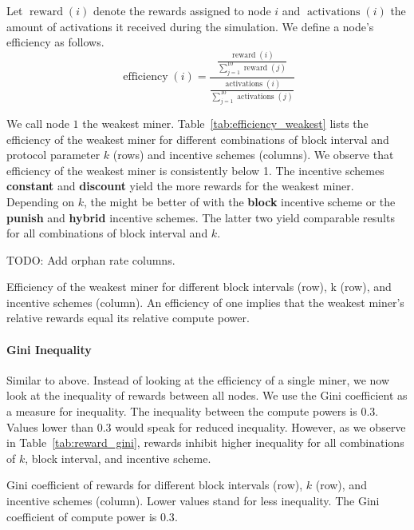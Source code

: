 \documentclass{article}
\begin{document}
Let $\operatorname{reward}(i)$ denote the rewards assigned to node $i$ and $\operatorname{activations}(i)$ the amount of activations it received during the simulation.
We define a node's efficiency as follows.
\[
  \operatorname{efficiency}(i) =
  \frac{
    \frac{\operatorname{reward}(i)}{\sum_{j=1}^{10}{\operatorname{reward}(j)}}
    }{
    \frac{\operatorname{activations}(i)}{\sum_{j=1}^{10}{\operatorname{activations}(j)}}
  }
\]

We call node $1$ the weakest miner.
Table~\ref{tab:efficiency_weakest} lists the efficiency of the weakest miner for different combinations of block interval and protocol parameter $k$ (rows) and incentive schemes (columns). We observe that efficiency of the weakest miner is consistently below 1. The incentive schemes \textbf{constant} and \textbf{discount} yield the more rewards for the weakest miner. Depending on $k$, the might be better of with the \textbf{block} incentive scheme or the \textbf{punish} and \textbf{hybrid} incentive schemes. The latter two yield comparable results for all combinations of block interval and $k$.

TODO: Add orphan rate columns.

\begin{table}
  \caption{Efficiency of the weakest miner for different block intervals (row), k (row), and incentive schemes (column). An efficiency of one implies that the weakest miner's relative rewards equal its relative compute power.}
  \label{tab:efficiency_weakest}
  
\end{table}

\paragraph{Gini Inequality}

Similar to above.
Instead of looking at the efficiency of a single miner, we now look at the inequality of rewards between all nodes.
We use the Gini coefficient as a measure for inequality.
The inequality between the compute powers is 0.3.
Values lower than 0.3 would speak for reduced inequality.
However, as we observe in Table~\ref{tab:reward_gini}, rewards inhibit higher inequality for all combinations of $k$, block interval, and incentive scheme.

\begin{table}
  \caption{Gini coefficient of rewards for different block intervals (row), $k$ (row), and incentive schemes (column).
  Lower values stand for less inequality. The Gini coefficient of compute power is $0.3$.}
  \label{tab:reward_gini}
  
\end{table}
\end{document}
